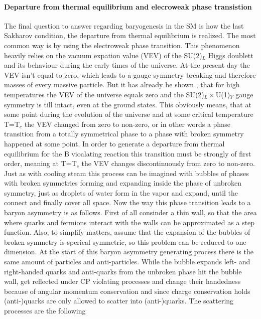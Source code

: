 \paragraph{Departure from thermal equilibrium and elecroweak phase transistion} The final question to answer regarding baryogenesis in the SM is how the last Sakharov condition, the departure from thermal equilibrium is realized. The most common way is by using the electroweak phase transition. \newline
This phenomenon heavily relies on the vacuum expation value (VEV) of the SU(2)$_L$ Higgs doublett and its behaviour during the early times of the universe. At the present day the VEV isn't equal to zero, which leads to a gauge symmetry breaking and therefore masses of every massive particle. But it has already be shown \cite[Ref. 32]{Bernreuther:2002uj}, that for high temperatures the VEV of the universe equals zero and the SU(2)$_L\times$U(1)$_Y$ gauge symmetry is till intact, even at the ground states. This obviously means, that at some point during the evolution of the universe and at some critical temperature T=T$_c$ the VEV changed from zero to non-zero, or in other words a phase transition from a totally symmetrical phase to a phase with broken symmetry happened at some point. In order to generate a departure from thermal equilibrium for the B vioalating reaction this transition must be strongly of first order, meaning at T=T$_c$ the VEV changes discontinuously from zero to non-zero. \newline
Just as with cooling steam this process can be imagined with bubbles of phases with broken symmetries forming and expanding inside the phase of unbroken symmetry, just as droplets of water form in the vapor and expand, until the connect and finally cover all space. Now the way this phase transition leads to a baryon asymmetry is as follows. \newline
First of all consinder a thin wall, so that the area where quarks and fermions interact with the walls can be approximated as a step function. Also, to simplify matters, assume that the expansion of the bubbles of broken symmetry is sperical symmetric, so this problem can be reduced to one dimension. \newline
At the start of this baryon asymmetry generating process there is the same amount of particles and anti-particles. \newline
While the bubble expands left- and right-handed quarks and anti-quarks from the unbroken phase hit the bubble wall, get reflected under CP violating processes and change their handedness because of angular momentum conservation and since charge conservation holds (anti-)quarks are only allowed to scatter into (anti-)quarks. The scattering processes are the following
